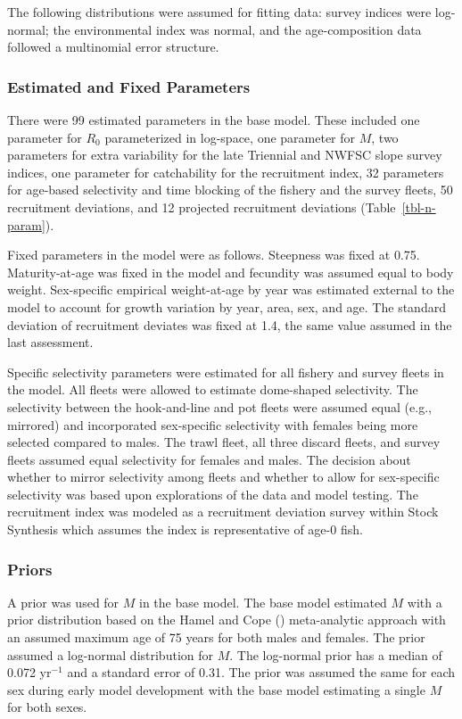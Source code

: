 \documentclass[
  english,
]{article}
\begin{document}
The following distributions were assumed for fitting data: survey
indices were log-normal; the environmental index was normal, and the
age-composition data followed a multinomial error structure.

\subsubsection{Estimated and Fixed
Parameters}\label{estimated-and-fixed-parameters}

There were 99 estimated parameters in the base model. These included one
parameter for \(R_0\) parameterized in log-space, one parameter for
\(M\), two parameters for extra variability for the late Triennial and
NWFSC slope survey indices, one parameter for catchability for the
recruitment index, 32 parameters for age-based selectivity and time
blocking of the fishery and the survey fleets, 50 recruitment
deviations, and 12 projected recruitment deviations
(Table~\ref{tbl-n-param}).

Fixed parameters in the model were as follows. Steepness was fixed at
0.75. Maturity-at-age was fixed in the model and fecundity was assumed
equal to body weight. Sex-specific empirical weight-at-age by year was
estimated external to the model to account for growth variation by year,
area, sex, and age. The standard deviation of recruitment deviates was
fixed at 1.4, the same value assumed in the last assessment.

Specific selectivity parameters were estimated for all fishery and
survey fleets in the model. All fleets were allowed to estimate
dome-shaped selectivity. The selectivity between the hook-and-line and
pot fleets were assumed equal (e.g., mirrored) and incorporated
sex-specific selectivity with females being more selected compared to
males. The trawl fleet, all three discard fleets, and survey fleets
assumed equal selectivity for females and males. The decision about
whether to mirror selectivity among fleets and whether to allow for
sex-specific selectivity was based upon explorations of the data and
model testing. The recruitment index was modeled as a recruitment
deviation survey within Stock Synthesis which assumes the index is
representative of age-0 fish.

\subsubsection{Priors}\label{priors}

A prior was used for \(M\) in the base model. The base model estimated
\(M\) with a prior distribution based on the Hamel and Cope
() meta-analytic approach
with an assumed maximum age of 75 years for both males and females. The
prior assumed a log-normal distribution for \(M\). The log-normal prior
has a median of 0.072 yr\(^{-1}\) and a standard error of 0.31. The
prior was assumed the same for each sex during early model development
with the base model estimating a single \(M\) for both sexes.
\end{document}
